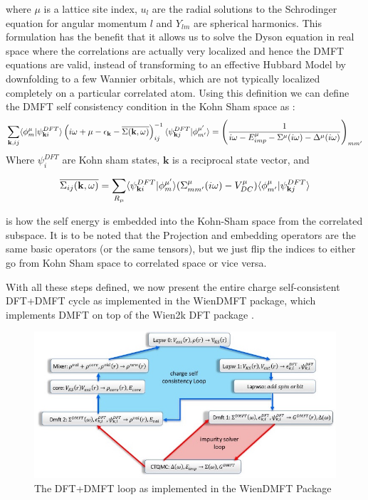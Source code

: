 \documentclass[10pt]{ruthesis}
\begin{document}
where $\mu$ is a lattice site index, $u_l$ are the radial solutions to the Schrodinger equation for angular momentum $l$ and  $Y_{lm}$ are spherical harmonics. This formulation has the benefit that it allows us to solve the Dyson equation in real space where the correlations are actually very localized and hence the DMFT equations are valid, instead of transforming to an effective Hubbard Model by  downfolding to a few Wannier orbitals, which are not typically localized completely on a particular correlated atom. Using this definition we can define the  DMFT self consistency condition in the Kohn Sham space as :
\begin{equation}\label{DFT+DMFT SC}
\sum_{\mathbf{k},ij} \langle \phi^\mu_m|\psi^{DFT}_{\mathbf{k} i} \rangle \left( i\omega +\mu -\epsilon_{\mathbf{k}} -\overline{\Sigma(\mathbf{k} ,\omega)} \right)^{-1}_{ij}\langle\psi^{DFT}_{\mathbf{k} j}  |\phi^{\mu'}_{m'} \rangle = \left( \dfrac{1}{i\omega -E^{\mu}_{imp}-\Sigma^{\mu}(i\omega)-\Delta^{\mu}(i\omega)} \right) _{mm'}
\end{equation}
Where $\psi^{DFT}_i$ are Kohn sham states, $\mathbf{k}$ is a reciprocal state vector, and 

\begin{equation}\label{Embedding}
\overline{\Sigma_{ij}(\mathbf{k} ,\omega)}= \sum_{R_\mu} \langle\psi^{DFT}_{\mathbf{k} i}  |\phi^{\mu'}_{m} \rangle (\Sigma^{\mu}_{mm'} (i\omega) -V^{\mu}_{DC} )\langle \phi^\mu_{m'}|\psi^{DFT}_{\mathbf{k} j} \rangle
\end{equation}

is how the self energy is embedded into the Kohn-Sham space from the correlated subspace. It is to be noted that the Projection and embedding operators are the same basic operators (or the same tensors), but we just flip the indices to either go from Kohn Sham space to correlated space or vice versa.
 
With all these steps defined, we now present the entire charge self-consistent DFT+DMFT cycle as implemented in the WienDMFT \cite{PRB_dmft_wien2k_2010_Chuck_Haule} package, which implements DMFT on top of the Wien2k DFT package \cite{wien2k}. 

\begin{figure}[H]
 \includegraphics[width=\columnwidth]{Dmft_loop.jpg}
 \caption{The DFT+DMFT loop as implemented in the WienDMFT Package \label{DMFT_Loop}}
\end{figure}
\end{document}
